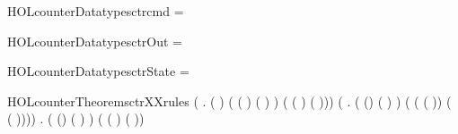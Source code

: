 \newcommand{\HOLcounterDate}{02 March 2020}
\newcommand{\HOLcounterTime}{20:04}
\begin{SaveVerbatim}{HOLcounterDatatypesctrcmd}
 =   \HOLTokenBar{}  \HOLTokenBar{} 
\end{SaveVerbatim}
\newcommand{\HOLcounterDatatypesctrcmd}{\UseVerbatim{HOLcounterDatatypesctrcmd}}
\begin{SaveVerbatim}{HOLcounterDatatypesctrOut}
 =  
\end{SaveVerbatim}
\newcommand{\HOLcounterDatatypesctrOut}{\UseVerbatim{HOLcounterDatatypesctrOut}}
\begin{SaveVerbatim}{HOLcounterDatatypesctrState}
 =  
\end{SaveVerbatim}
\newcommand{\HOLcounterDatatypesctrState}{\UseVerbatim{HOLcounterDatatypesctrState}}
\newcommand{\HOLcounterDatatypes}{
\HOLcounterDatatypesctrcmd\HOLcounterDatatypesctrOut\HOLcounterDatatypesctrState}
\begin{SaveVerbatim}{HOLcounterTheoremsctrXXrules}
\HOLTokenTurnstile{} (\HOLSymConst{\HOLTokenForall{}} .
       ( ) ( ( \HOLSymConst{::}) ( ) )
        (  ( ) ( \HOLSymConst{::}))) \HOLSymConst{\HOLTokenConj{}}
   (\HOLSymConst{\HOLTokenForall{}} .
        ( (\HOLSymConst{::}) ( ) )
        (  ( ( \HOLSymConst{-} )) ( ( \HOLSymConst{-} )\HOLSymConst{::}))) \HOLSymConst{\HOLTokenConj{}}
   \HOLSymConst{\HOLTokenForall{}} .
       ( (\HOLSymConst{::}) ( ) )
       (  ( ) ( \HOLSymConst{::}))
\end{SaveVerbatim}
\newcommand{\HOLcounterTheoremsctrXXrules}{\UseVerbatim{HOLcounterTheoremsctrXXrules}}
